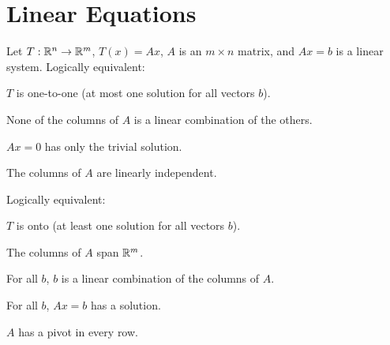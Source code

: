 \section{Linear Equations}
\begin{outline}
    Let $T: \mathbb{R} ^ n \to \mathbb{R} ^ m$, $T(x) = Ax$, $A$ is an $m\times n$ matrix, and
    $Ax = b$ is a linear system.
    Logically equivalent:
    \begin{compactitem}
    \item $T$ is one-to-one (at most one solution for all vectors $b$).
    \item None of the columns of $A$ is a linear combination of the others.
    \item $Ax = 0$ has only the trivial solution.
    \item The columns of $A$ are linearly independent.
    \end{compactitem}

    \columnbreak

    Logically equivalent:
    \begin{compactitem}
    \item $T$ is onto (at least one solution for all vectors $b$).
    \item The columns of $A$ span $\mathbb{R} ^ m$.
    \item For all $b$, $b$ is a linear combination of the columns of $A$.
    \item For all $b$, $Ax = b$ has a solution.
    \item $A$ has a pivot in every row.
    \end{compactitem}
\end{outline}

